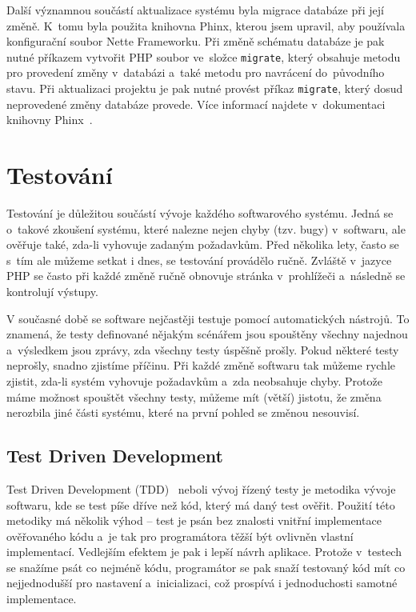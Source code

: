 \documentclass[11pt,twoside,a4paper]{book}
\newcommand*{\nomExpl}[2]{#2 (#1)\nomenclature{#1}{#2}} 	%
\begin{document}
Další významnou součástí aktualizace systému byla migrace databáze při její změně. K~tomu byla použita knihovna Phinx, kterou jsem upravil, aby používala konfigurační soubor Nette Frameworku. Při změně schématu databáze je pak nutné příkazem vytvořit PHP soubor ve~složce \verb|migrate|, který obsahuje metodu pro provedení změny v~databázi a~také metodu pro navrácení do~původního stavu. Při aktualizaci projektu je pak nutné provést příkaz \verb|migrate|, který dosud neprovedené změny databáze provede. Více informací najdete v~dokumentaci knihovny Phinx~\cite{phinx}.



\chapter{Testování}
Testování je důležitou součástí vývoje každého softwarového systému. Jedná se o~takové zkoušení systému, které nalezne nejen chyby (tzv. bugy) v~softwaru, ale ověřuje také, zda-li vyhovuje zadaným požadavkům. Před několika lety, často se s~tím ale můžeme setkat i dnes, se testování provádělo ručně. Zvláště v~jazyce PHP se často při každé změně ručně obnovuje stránka v~prohlížeči a~následně se kontrolují výstupy.

V současné době se software nejčastěji testuje pomocí automatických nástrojů. To znamená, že testy definované nějakým scénářem jsou spouštěny všechny najednou a~výsledkem jsou zprávy, zda všechny testy úspěšně prošly. Pokud některé testy neprošly, snadno zjistíme příčinu. Při každé změně softwaru tak můžeme rychle zjistit, zda-li systém vyhovuje požadavkům a~zda neobsahuje chyby. Protože máme možnost spouštět všechny testy, můžeme mít (větší) jistotu, že změna nerozbila jiné části systému, které na první pohled se změnou nesouvisí.


\section{Test Driven Development}
\nomExpl{TDD}{Test Driven Development}~\cite{tdd} neboli vývoj řízený testy je metodika vývoje softwaru, kde se test píše dříve než kód, který má daný test ověřit. Použití této metodiky má několik výhod – test je psán bez znalosti vnitřní imple\-mentace ověřovaného kódu a~je tak pro programátora těžší být ovlivněn vlastní imple\-mentací. Vedlejším efektem je pak i lepší návrh aplikace. Protože v~testech se snažíme psát co nejméně kódu, programátor se pak snaží testovaný kód mít co nejjednodušší pro nastavení a~inicializaci, což prospívá i jednoduchosti samotné imple\-mentace.
\end{document}
